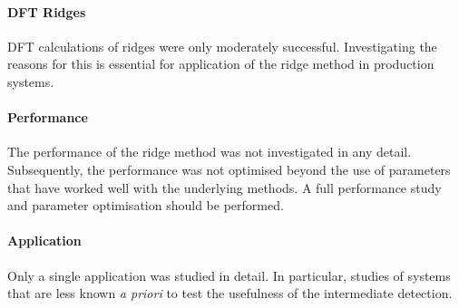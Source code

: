 \paragraph{DFT Ridges}
DFT calculations of ridges were only moderately successful.
Investigating the reasons for this is essential for application of the ridge method in production systems.

\paragraph{Performance}
The performance of the ridge method was not investigated in any detail.
Subsequently, the performance was not optimised beyond the use of parameters that have worked well with the underlying methods.
A full performance study and parameter optimisation should be performed.

\paragraph{Application}
Only a single application was studied in detail.
In particular, studies of systems that are less known \textit{a priori} to test the usefulness of the intermediate  detection.
